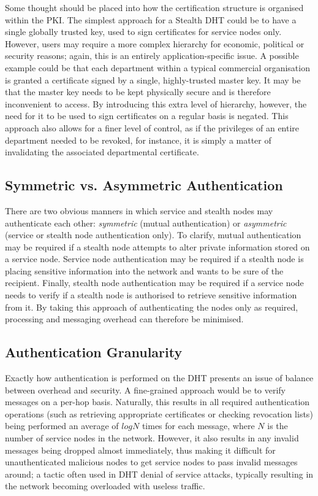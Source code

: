 \documentclass[pdftex,conference,10pt]{IEEEtran}
\begin{document}
Some thought should be placed into how the certification structure is
organised within the PKI. The simplest approach for a Stealth DHT could
be to have a single globally trusted key, used to sign certificates for
service nodes only. However, users may require a more complex hierarchy
for economic, political or security reasons; again, this is an entirely
application-specific issue. A possible example could be that each
department within a typical commercial organisation is granted a
certificate signed by a single, highly-trusted master key. It may be
that the master key needs to be kept physically secure and is therefore
inconvenient to access. By introducing this extra level of hierarchy,
however, the need for it to be used to sign certificates on a regular
basis is negated. This approach also allows for a finer level of
control, as if the privileges of an entire department needed to be
revoked, for instance, it is simply a matter of invalidating the
associated departmental certificate.

\subsection{Symmetric vs. Asymmetric Authentication}

There are two obvious manners in which service and stealth nodes may
authenticate each other: \emph{symmetric} (mutual authentication) or
\emph{asymmetric} (service or stealth node authentication only). To
clarify, mutual authentication may be required if a stealth node
attempts to alter private information stored on a service node. Service
node authentication may be required if a stealth node is placing
sensitive information into the network and wants to be sure of the
recipient. Finally, stealth node authentication may be required if a
service node needs to verify if a stealth node is authorised to
retrieve sensitive information from it. By taking this approach of
authenticating the nodes only as required, processing and messaging
overhead can therefore be minimised.

\subsection{Authentication Granularity}
\label{subsect-granularity}

Exactly how authentication is performed on the DHT presents an issue of
balance between overhead and security. A fine-grained approach would be
to verify messages on a per-hop basis. Naturally, this results in all
required authentication operations (such as retrieving appropriate
certificates or checking revocation lists) being performed an average
of $log{N}$ times for each message, where $N$ is the number of service
nodes in the network. However, it also results in any invalid messages
being dropped almost immediately, thus making it difficult for
unauthenticated malicious nodes to get service nodes to pass invalid
messages around; a tactic often used in DHT denial of service attacks,
typically resulting in the network becoming overloaded with useless
traffic.
\end{document}

